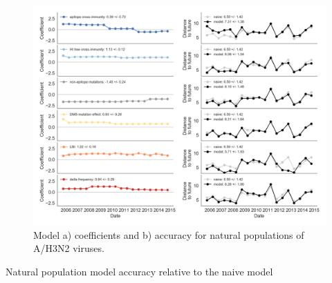 \begin{figure}[t]
  \begin{center}
  \includegraphics[width=\textwidth]{figures/unadjusted-model-accuracy-and-coefficients-for-natural-populations.png}
  \caption{Model a) coefficients and b) accuracy for natural populations of A/H3N2 viruses.}
  \label{fig:unadjusted_model_accuracy_and_coefficients_for_natural_populations}
  \end{center}
\end{figure}

\begin{table}[ht]
  \begin{center}
    
    \caption{Natural population model accuracy relative to the naive model}
    \label{table_natural_model_selection}
  \end{center}
\end{table}


